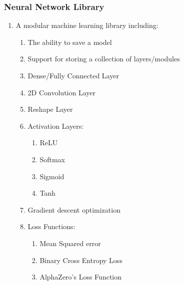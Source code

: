 \documentclass{article}
\begin{document}
    \subsubsection{Neural Network Library} 
    \begin{enumerate} 
        \item A modular machine learning library including:
        \begin{enumerate}
            \item The ability to save a model
            \item Support for storing a collection of layers/modules
            \item Dense/Fully Connected Layer
            \item 2D Convolution Layer
            \item Reshape Layer
            \item Activation Layers:
            \begin{enumerate}
                \item ReLU
                \item Softmax
                \item Sigmoid
                \item Tanh
            \end{enumerate} 
            \item Gradient descent optimization
            \item Loss Functions:
            \begin{enumerate}
                \item Mean Squared error
                \item Binary Cross Entropy Loss
                \item AlphaZero's Loss Function
            \end{enumerate}
        \end{enumerate}
    \end{enumerate}
\end{document}
